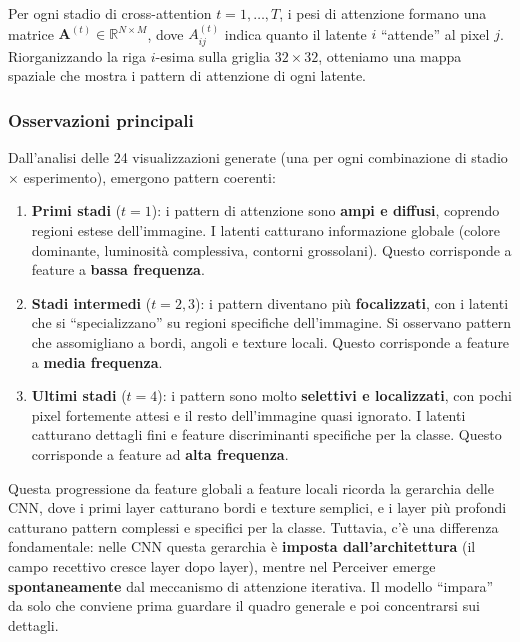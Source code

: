 \documentclass[12pt,a4paper]{article}
\begin{document}
Per ogni stadio di cross-attention $t = 1, \ldots, T$, i pesi di attenzione formano una matrice $\mathbf{A}^{(t)} \in \mathbb{R}^{N \times M}$, dove $A^{(t)}_{ij}$ indica quanto il latente $i$ ``attende'' al pixel $j$. Riorganizzando la riga $i$-esima sulla griglia $32 \times 32$, otteniamo una mappa spaziale che mostra i pattern di attenzione di ogni latente.

\subsubsection{Osservazioni principali}

Dall'analisi delle 24 visualizzazioni generate (una per ogni combinazione di stadio $\times$ esperimento), emergono pattern coerenti:

\begin{enumerate}[label=\arabic*.]
    \item \textbf{Primi stadi} ($t=1$): i pattern di attenzione sono \textbf{ampi e diffusi}, coprendo regioni estese dell'immagine. I latenti catturano informazione globale (colore dominante, luminosit\`a complessiva, contorni grossolani). Questo corrisponde a feature a \textbf{bassa frequenza}.

    \item \textbf{Stadi intermedi} ($t=2,3$): i pattern diventano pi\`u \textbf{focalizzati}, con i latenti che si ``specializzano'' su regioni specifiche dell'immagine. Si osservano pattern che assomigliano a bordi, angoli e texture locali. Questo corrisponde a feature a \textbf{media frequenza}.

    \item \textbf{Ultimi stadi} ($t=4$): i pattern sono molto \textbf{selettivi e localizzati}, con pochi pixel fortemente attesi e il resto dell'immagine quasi ignorato. I latenti catturano dettagli fini e feature discriminanti specifiche per la classe. Questo corrisponde a feature ad \textbf{alta frequenza}.
\end{enumerate}

\begin{notabox}
Questa progressione da feature globali a feature locali ricorda la gerarchia delle CNN, dove i primi layer catturano bordi e texture semplici, e i layer pi\`u profondi catturano pattern complessi e specifici per la classe. Tuttavia, c'\`e una differenza fondamentale: nelle CNN questa gerarchia \`e \textbf{imposta dall'architettura} (il campo recettivo cresce layer dopo layer), mentre nel Perceiver emerge \textbf{spontaneamente} dal meccanismo di attenzione iterativa. Il modello ``impara'' da solo che conviene prima guardare il quadro generale e poi concentrarsi sui dettagli.
\end{notabox}
\end{document}
